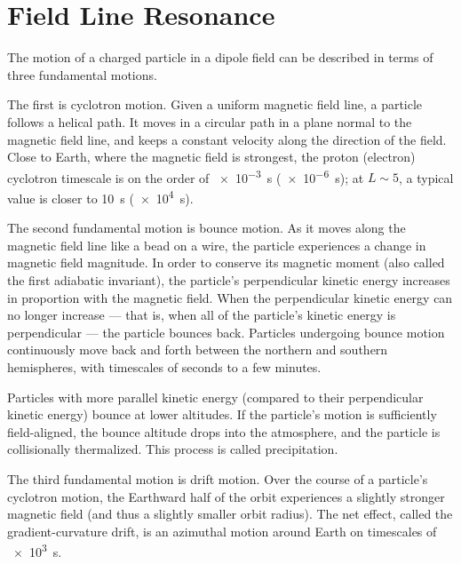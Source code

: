 


\chapter{Field Line Resonance}
  \label{ch_flrs}



The motion of a charged particle in a dipole field can be described in terms
of three fundamental motions. 

The first is cyclotron motion. Given a uniform magnetic field line, a particle
follows a helical path. It moves in a circular path in a plane normal to the
magnetic field line, and keeps a constant velocity along the direction of the
field. Close to Earth, where the magnetic field is strongest, the proton
(electron) cyclotron timescale is on the order of \SI{e-3}{\s} (\SI{e-6}{\s});
at $L \sim 5$, a typical value is closer to \SI{10}{\s} (\SI{e4}{\s}). 

The second fundamental motion is bounce motion. As it moves along the magnetic
field line like a bead on a wire, the particle experiences a change in magnetic
field magnitude. In order to conserve its magnetic moment (also called the
first adiabatic invariant), the particle's perpendicular kinetic energy
increases in proportion with the magnetic field. When the perpendicular kinetic
energy can no longer increase --- that is, when all of the particle's kinetic
energy is perpendicular --- the particle bounces back. Particles undergoing
bounce motion continuously move back and forth between the northern and
southern hemispheres, with timescales of seconds to a few
minutes\cite{schulz_1974}. 

Particles with more parallel kinetic energy (compared to their perpendicular
kinetic energy) bounce at lower altitudes. If the particle's motion is
sufficiently field-aligned, the bounce altitude drops into the atmosphere, and
the particle is collisionally thermalized. This process is called
precipitation.

The third fundamental motion is drift motion. Over the course of a particle's
cyclotron motion, the Earthward half of the orbit experiences a slightly
stronger magnetic field (and thus a slightly smaller orbit radius). The net
effect, called the gradient-curvature drift, is an azimuthal motion around
Earth on timescales of \about\SI{e3}{\s}\cite{schulz_1974}. 

